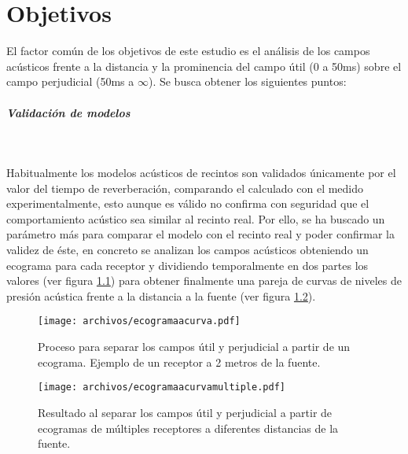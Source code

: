 
\chapter{Objetivos}
\label{objetivos}

El factor común de los objetivos de este estudio es el análisis de los campos acústicos frente a la distancia y la prominencia del campo útil (0 a 50ms) sobre el campo perjudicial (50ms a $\infty$).
Se busca obtener los siguientes puntos:


\paragraph{Validación de modelos}~

Habitualmente los modelos acústicos de recintos son validados únicamente por el valor del tiempo de reverberación, comparando el calculado con el medido experimentalmente, esto aunque es válido no confirma con seguridad que el comportamiento acústico sea similar al recinto real. Por ello, se ha buscado un parámetro más para comparar el modelo con el recinto real y poder confirmar la validez de éste, en concreto se analizan los campos acústicos obteniendo un ecograma para cada receptor y dividiendo temporalmente en dos partes los valores (ver figura \ref{fig:democampos}) para obtener finalmente una pareja de curvas de niveles de presión acústica frente a la distancia a la fuente (ver figura \ref{fig:democamposmultiple}).
\begin{figure}[ht]
    \centering
    \texttt{[image: archivos/ecogramaacurva.pdf]}
    \caption{Proceso para separar los campos útil y perjudicial a partir de un ecograma. Ejemplo de un receptor a 2 metros de la fuente.}
    \label{fig:democampos}
    \vspace{-0.5cm}%
\end{figure}
\FloatBarrier

\begin{figure}[ht]
    \centering
    \texttt{[image: archivos/ecogramaacurvamultiple.pdf]}
    \caption{Resultado al separar los campos útil y perjudicial a partir de ecogramas de múltiples receptores a diferentes distancias de la fuente.}
    \label{fig:democamposmultiple}
\end{figure}
\FloatBarrier

